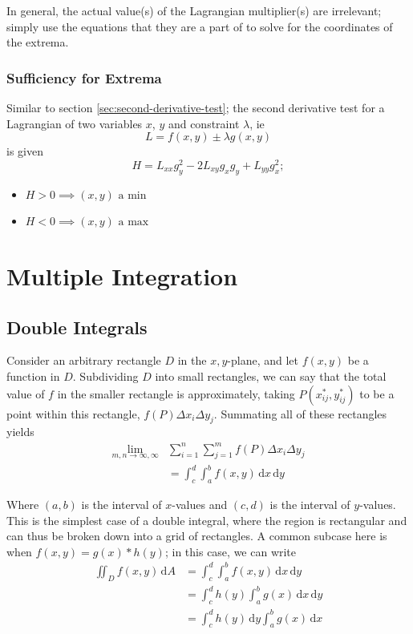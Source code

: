 \documentclass[12pt]{article}
\begin{document}
{In general, the actual value(s) of the Lagrangian multiplier(s) are irrelevant; simply use the equations that they are a part of to solve for the coordinates of the extrema.

\subsubsection{Sufficiency for Extrema}
Similar to section \ref{sec:second-derivative-test}; the second derivative test for a Lagrangian of two variables $x$, $y$ and constraint $\lambda$, ie \[L = f(x,y) \pm \lambda g(x,y)\] is given \[H = L_{xx} g_y^2 - 2 L_{xy}g_x g_y + L_{yy}g_x^2;\] \begin{itemize}
    \item $H > 0 \implies (x,y) \text{ a min}$
    \item $H < 0 \implies (x,y) \text{ a max}$
\end{itemize}

\newpage
\section{Multiple Integration}
\subsection{Double Integrals}
Consider an arbitrary rectangle $D$ in the $x,y$-plane, and let $f(x,y)$ be a function in $D$. Subdividing $D$ into small rectangles, we can say that the total value of $f$ in the smaller rectangle is approximately, taking $P(x^*_{ij}, y^*_{ij})$ to be a point within this rectangle, $f(P) \Delta x_i \Delta y_j$. Summating all of these rectangles yields \begin{align*}
    \lim_{m, n \to \infty, \infty}& \sum_{i = 1}^n \sum_{j=1}^m f(P) \Delta x_i \Delta y_j \\
    &= \int_c^d \int_a^b f(x,y) \, \text{d}x \, \text{d}y
\end{align*}

Where $(a,b)$ is the interval of $x$-values and $(c,d)$ is the interval of $y$-values. This is the simplest case of a double integral, where the region is rectangular and can thus be broken down into a grid of rectangles. A common subcase here is when $f(x,y) = g(x) * h(y)$; in this case, we can write \begin{align*}
   \iint_D f(x,y) \, \text{d}A &= \int_c^d \int_a^b f(x,y) \, \text{d}x \, \text{d}y\\
   &= \int_c^d h(y) \int_a^b g(x) \, \text{d}x \, \text{d}y\\
   &= \int_c^d h(y) \, \text{d}y \int_a^b g(x) \, \text{d}x\\
\end{align*}

}
\end{document}

